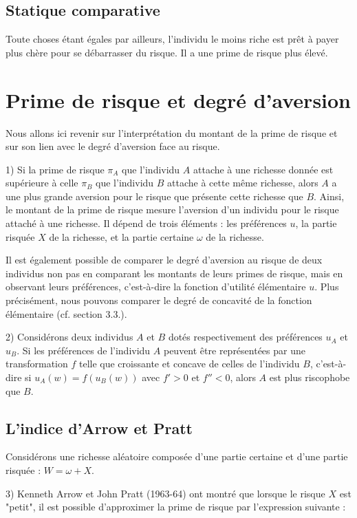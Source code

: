 \documentclass[a4paper, 12pt]{report}
\begin{document}
\subsection{Statique comparative}

Toute choses étant égales par ailleurs, l'individu le moins riche est prêt à payer plus chère pour se débarrasser du risque. Il a une prime de risque plus élevé.

\section{Prime de risque et degré d'aversion}

Nous allons ici revenir sur l'interprétation du montant de la prime de risque et sur son lien avec le degré d'aversion face au risque. 

1) Si la prime de risque $\pi_A$ que l'individu $A$ attache à une richesse donnée est supérieure à celle $\pi_B$ que l'individu $B$ attache à cette même richesse, alors $A$ a une plus grande aversion pour le risque que présente cette richesse que $B$. Ainsi, le montant de la prime de risque mesure l'aversion d'un individu pour le risque attaché à une richesse. Il dépend de trois éléments : les préférences $u$, la partie risquée $X$ de la richesse, et la partie certaine $\omega$ de la richesse.

Il est également possible de comparer le degré d'aversion au risque de deux individus non pas en comparant les montants de leurs primes de risque, mais en observant leurs préférences, c'est-à-dire la fonction d'utilité élémentaire $u$. Plus précisément, nous pouvons comparer le degré de concavité de la fonction élémentaire (cf. section 3.3.).

2) Considérons deux individus $A$ et $B$ dotés respectivement des préférences $u_A$ et $u_B$. Si les préférences de l'individu $A$ peuvent être représentées par une transformation $f$ telle que croissante et concave de celles de l'individu $B$, c'est-à-dire si $u_A(w) = f(u_B(w))$ avec $f' > 0$ et $f'' < 0$, alors $A$ est plus riscophobe que $B$.

\subsection{L'indice d'Arrow et Pratt}

Considérons une richesse aléatoire composée d'une partie certaine et d'une partie risquée : $W = \omega + X$.

3) Kenneth Arrow et John Pratt (1963-64) ont montré que lorsque le risque $X$ est "petit", il est possible d'approximer la prime de risque par l'expression suivante :
\end{document}
